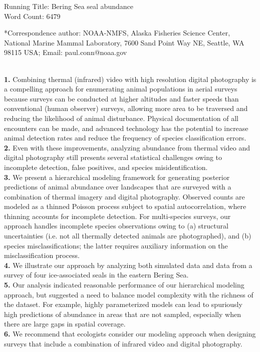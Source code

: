 \documentclass[12pt,fleqn]{article}
\begin{document}
\rm \begin{flushleft}
\vspace{30mm}
Running Title: Bering Sea seal abundance \\
\vspace{10mm}
Word Count: 6479

\vspace{80mm}

\setlength{\textheight}{575pt}
\setlength{\baselineskip}{12pt}


*Correspondence author: NOAA-NMFS, Alaska Fisheries Science Center, National Marine Mammal Laboratory, 7600 Sand Point Way NE, Seattle, WA 98115 USA;
Email: paul.conn@noaa.gov


\normalsize\newpage
\setlength{\baselineskip}{24pt}

\\
{\bf 1.} Combining thermal (infrared) video with high resolution digital photography is a compelling approach for enumerating animal populations in aerial surveys because surveys can be conducted at higher altitudes and faster speeds than conventional (human observer) surveys, allowing more area to be traversed and reducing the likelihood of animal disturbance. Physical documentation of all encounters can be made, and advanced technology has the potential to increase animal detection rates and reduce the frequency of species classification errors.\\
{\bf 2.} Even with these improvements, analyzing abundance from thermal video and digital photography still presents several statistical challenges owing to incomplete detection, false positives, and species misidentification. \\
{\bf 3.} We present a hierarchical modeling framework for generating posterior predictions of animal abundance over landscapes that are surveyed with a combination of thermal imagery and digital photography.  Observed counts are modeled as a thinned Poisson process subject to spatial autocorrelation, where thinning accounts for incomplete detection.  For multi-species surveys, our approach handles incomplete species observations owing to (a) structural uncertainties (i.e. not all thermally detected animals are photographed), and (b) species misclassifications; the latter requires auxiliary information on the misclassification process.  \\
{\bf 4.}   We illustrate our approach by analyzing both simulated data and data from a survey of four ice-associated seals in the eastern Bering Sea.\\
{\bf 5.}  Our analysis indicated reasonable performance of our hierarchical modeling approach, but suggested
a need to balance model complexity with the richness of the dataset.  For example, highly parameterized models can lead to spuriously high predictions of abundance in areas that are not sampled, especially when there are large gaps in spatial coverage. \\
{\bf 6.}  We recommend that ecologists consider our modeling approach when designing surveys that include a combination of infrared video and digital photography.\\


\end{flushleft}
\end{document}
